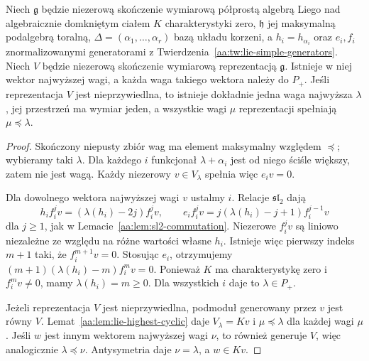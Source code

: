 \begin{twierdzenie}
\label{aa:tw:lie-highest-necessary}
Niech $\mathfrak g$ będzie niezerową skończenie wymiarową półprostą algebrą Liego nad algebraicznie domkniętym ciałem $K$ charakterystyki zero, $\mathfrak h$ jej maksymalną podalgebrą toralną, $\Delta=(\alpha_1,\ldots,\alpha_r)$ bazą układu korzeni, a $h_i=h_{\alpha_i}$ oraz $e_i,f_i$ znormalizowanymi generatorami z Twierdzenia~\ref{aa:tw:lie-simple-generators}. Niech $V$ będzie niezerową skończenie wymiarową reprezentacją $\mathfrak g$. Istnieje w niej wektor najwyższej wagi, a każda waga takiego wektora należy do $P_+$. Jeśli reprezentacja $V$ jest nieprzywiedlna, to istnieje dokładnie jedna waga najwyższa $\lambda$, jej przestrzeń ma wymiar jeden, a wszystkie wagi $\mu$ reprezentacji spełniają $\mu\preceq\lambda$.
\end{twierdzenie}
\begin{proof}
Skończony niepusty zbiór wag ma element maksymalny względem $\preceq$; wybieramy taki $\lambda$. Dla każdego $i$ funkcjonał $\lambda+\alpha_i$ jest od niego ściśle większy, zatem nie jest wagą. Każdy niezerowy $v\in V_\lambda$ spełnia więc $e_iv=0$.

Dla dowolnego wektora najwyższej wagi $v$ ustalmy $i$. Relacje $\mathfrak{sl}_2$ dają
\[
 h_i f_i^jv=(\lambda(h_i)-2j)f_i^jv,\qquad
 e_i f_i^jv=j(\lambda(h_i)-j+1)f_i^{j-1}v
\]
dla $j\ge1$, jak w Lemacie~\ref{aa:lem:sl2-commutation}. Niezerowe $f_i^jv$ są liniowo niezależne ze względu na różne wartości własne $h_i$. Istnieje więc pierwszy indeks $m+1$ taki, że $f_i^{m+1}v=0$. Stosując $e_i$, otrzymujemy
$(m+1)(\lambda(h_i)-m)f_i^mv=0$. Ponieważ $K$ ma charakterystykę zero i $f_i^mv\ne0$, mamy $\lambda(h_i)=m\ge0$. Dla wszystkich $i$ daje to $\lambda\in P_+$.

Jeżeli reprezentacja $V$ jest nieprzywiedlna, podmoduł generowany przez $v$ jest równy $V$. Lemat~\ref{aa:lem:lie-highest-cyclic} daje $V_\lambda=Kv$ i $\mu\preceq\lambda$ dla każdej wagi $\mu$. Jeśli $w$ jest innym wektorem najwyższej wagi $\nu$, to również generuje $V$, więc analogicznie $\lambda\preceq\nu$. Antysymetria daje $\nu=\lambda$, a $w\in Kv$.
\end{proof}

